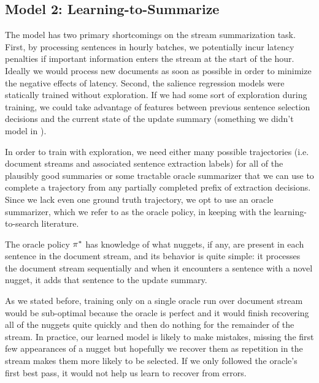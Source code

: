 \subsection{Model 2: Learning-to-Summarize}

The \sap{} model has two primary shortcomings on the stream summarization
task. First, by processing sentences in hourly batches, we potentially 
incur latency penalties if important information enters the stream
at the start of the hour.
Ideally we would process new documents as soon as possible in order 
to minimize the negative effects of latency. Second, the salience
regression models were statically trained without exploration. If we had 
some sort of exploration during training, we could take advantage of 
features between previous sentence selection decisions and the current
state of the update summary (something we didn't model in \sap).

In order to train with exploration, we need either many possible trajectories
(i.e. document streams and associated sentence extraction labels) for all
of the plausibly good summaries or some tractable oracle summarizer 
that we can use to complete a trajectory from any partially completed prefix
of extraction decisions. Since we lack even one ground truth trajectory, we
opt to use an oracle summarizer, which we refer to as the oracle policy, 
in keeping with the learning-to-search literature.




The oracle policy $\pi^{*}$ has knowledge of what nuggets, 
if any, are present in each sentence in the document stream, and its behavior
is quite simple: it processes the document stream sequentially and when it 
encounters a sentence with a novel nugget, it adds that sentence to the update
summary.


As we stated before, training only on a single oracle run over document stream
would be sub-optimal because the oracle is perfect and it would finish 
recovering all of the nuggets quite quickly and then do nothing for
the remainder of the stream. In practice, our learned model is likely to
make mistakes, missing the first few appearances of a nugget but hopefully
we recover them as repetition in the stream makes them more likely to be 
selected. If we only followed the oracle's first best pass, it would not help us learn
to recover from errors.

